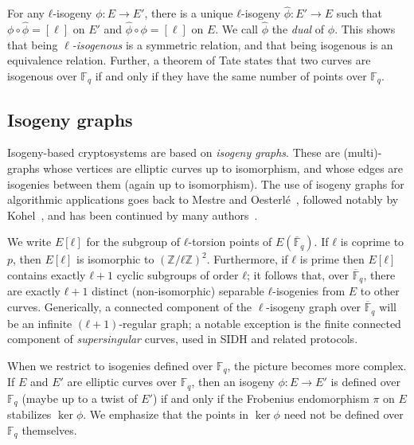 \documentclass{llncs}
\newcommand{\F}{\mathbb{F}}
\newcommand{\Fbar}{\overline{\mathbb{F}}}
\begin{document}
For any $ℓ$-isogeny $ϕ:E→E'$, there is a unique $ℓ$-isogeny
$\hat{ϕ}:E'→E$ such that $ϕ∘\hat{ϕ} = [\ell]$ on $E'$
and $\hat{ϕ}∘ϕ = [\ell]$ on $E$.
We call $\hat{ϕ}$ the \emph{dual} of $ϕ$. This
shows that being \emph{$\ell$-isogenous} is a symmetric
relation, and that being isogenous is an equivalence relation.
 Further, a theorem of Tate states that two curves are
isogenous over $\F_q$ if and only if they have the same number of
points over $\F_q$.


\subsection{Isogeny graphs}
\label{sec:isogeny-graphs}

Isogeny-based cryptosystems are based on \emph{isogeny graphs}.
These are
(multi)-graphs whose vertices are
elliptic curves up to isomorphism, and whose edges are isogenies
between them (again up to isomorphism).
The use of isogeny graphs for algorithmic applications 
goes back to Mestre and Oesterlé~\cite{Mestre},
followed notably by Kohel~\cite{kohel},
and has been continued by many
authors~\cite{Gal,fouquet+morain02,GHS,MiretMSTV06,jao+miller+venkatesan09}.

We write $E[ℓ]$ for the subgroup of $ℓ$-torsion points of
$E(\Fbar_q)$.  If $ℓ$ is coprime to $p$, then $E[ℓ]$ is isomorphic to
$(ℤ/ℓℤ)^2$.  Furthermore, if $ℓ$ is prime then $E[ℓ]$ contains exactly
$ℓ+1$ cyclic subgroups of order $ℓ$; it follows that, over $\Fbar_q$,
there are exactly $ℓ+1$ distinct (non-isomorphic) separable $ℓ$-isogenies 
from $E$ to other curves.
Generically, a connected component of the $\ell$-isogeny graph 
over $\Fbar_q$ will be an infinite $(ℓ+1)$-regular
graph; a notable exception is the finite connected component of
\emph{supersingular} curves, used in SIDH and related protocols.

When we restrict to isogenies defined over $\F_q$, 
the picture becomes more complex.  
If $E$ and $E'$ are elliptic curves over $\F_q$,
then an isogeny $ϕ:E→E'$ is defined over $\F_q$
(maybe up to a twist of $E'$) %
if and only if the Frobenius endomorphism $\pi$ on $E$ stabilizes $\ker ϕ$.
We emphasize that the points in $\ker\phi$ need not
be defined over $\F_q$ themselves.
\end{document}
